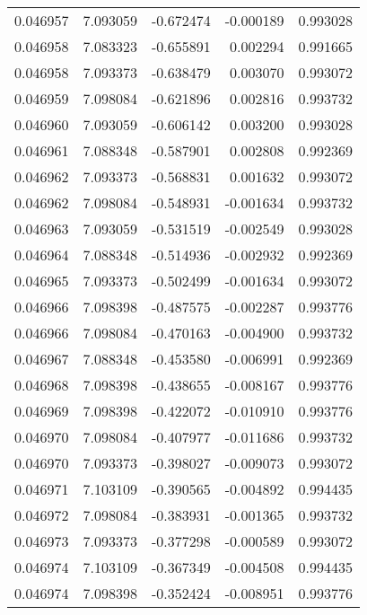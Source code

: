 \begin{tabular}{lrrrr}
0.046957    &  7.093059 & -0.672474 & -0.000189 &             0.993028 \\
0.046958    &  7.083323 & -0.655891 &  0.002294 &             0.991665 \\
0.046958    &  7.093373 & -0.638479 &  0.003070 &             0.993072 \\
0.046959    &  7.098084 & -0.621896 &  0.002816 &             0.993732 \\
0.046960    &  7.093059 & -0.606142 &  0.003200 &             0.993028 \\
0.046961    &  7.088348 & -0.587901 &  0.002808 &             0.992369 \\
0.046962    &  7.093373 & -0.568831 &  0.001632 &             0.993072 \\
0.046962    &  7.098084 & -0.548931 & -0.001634 &             0.993732 \\
0.046963    &  7.093059 & -0.531519 & -0.002549 &             0.993028 \\
0.046964    &  7.088348 & -0.514936 & -0.002932 &             0.992369 \\
0.046965    &  7.093373 & -0.502499 & -0.001634 &             0.993072 \\
0.046966    &  7.098398 & -0.487575 & -0.002287 &             0.993776 \\
0.046966    &  7.098084 & -0.470163 & -0.004900 &             0.993732 \\
0.046967    &  7.088348 & -0.453580 & -0.006991 &             0.992369 \\
0.046968    &  7.098398 & -0.438655 & -0.008167 &             0.993776 \\
0.046969    &  7.098398 & -0.422072 & -0.010910 &             0.993776 \\
0.046970    &  7.098084 & -0.407977 & -0.011686 &             0.993732 \\
0.046970    &  7.093373 & -0.398027 & -0.009073 &             0.993072 \\
0.046971    &  7.103109 & -0.390565 & -0.004892 &             0.994435 \\
0.046972    &  7.098084 & -0.383931 & -0.001365 &             0.993732 \\
0.046973    &  7.093373 & -0.377298 & -0.000589 &             0.993072 \\
0.046974    &  7.103109 & -0.367349 & -0.004508 &             0.994435 \\
0.046974    &  7.098398 & -0.352424 & -0.008951 &             0.993776 \\

\end{tabular}
